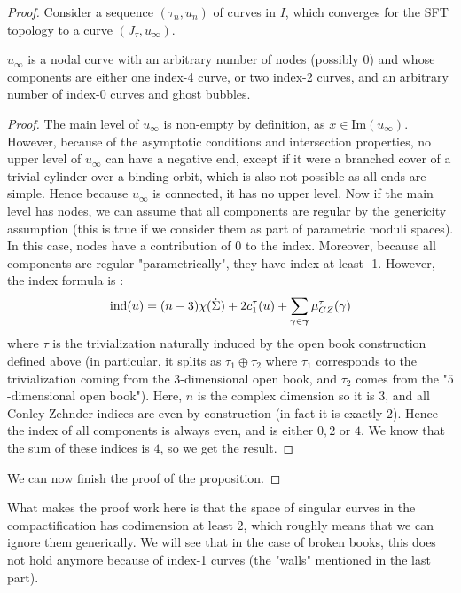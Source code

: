 \documentclass[../main.tex]{subfiles}
\begin{document}
\begin{proof}
Consider a sequence $(\tau_n,u_n) $ of curves in $I$, which converges for the SFT topology to a curve $(J_\tau,u_\infty)$. 

\begin{lemma}
$u_\infty$ is a nodal curve with an arbitrary number of nodes (possibly 0) and whose components are either one index-4 curve, or two index-2 curves, and an arbitrary number of index-0 curves and ghost bubbles. 
\end{lemma}

\begin{proof}
The main level of $u_\infty$ is non-empty by definition, as $x\in \text{Im}(u_\infty)$. However, because of the asymptotic conditions and intersection properties, no upper level of $u_\infty$ can have a negative end, except if it were a branched cover of a trivial cylinder over a binding orbit, which is also not possible as all ends are simple. Hence because $u_\infty$ is connected, it has no upper level. Now if the main level has nodes, we can assume that all components are regular by the genericity assumption (this is true if we consider them as part of parametric moduli spaces). In this case, nodes have a contribution of 0 to the index. Moreover, because all components are regular "parametrically", they have index at least -1. However, the index formula is :
$$\text{ind}(u) = (n-3)\chi(\dot\Sigma) + 2c_1^\tau(u) + \displaystyle\sum_{\gamma\in \bm\gamma}\mu_{CZ}^\tau(\gamma)$$
where $\tau$ is the trivialization naturally induced by the open book construction defined above (in particular, it splits as $\tau_1 \oplus \tau_2$ where $\tau_1$ corresponds to the trivialization coming from the $3$-dimensional open book, and $\tau_2$ comes from the "$5$-dimensional open book"). Here, $n$ is the complex dimension so it is $3$, and all Conley-Zehnder indices are even by construction (in fact it is exactly $2$). Hence the index of all components is always even, and is either $0,2$ or $4$. We know that the sum of these indices is $4$, so we get the result. 
\end{proof}

We can now finish the proof of the proposition. 

\end{proof}

\begin{remark}
What makes the proof work here is that the space of singular curves in the compactification has codimension at least $2$, which roughly means that we can ignore them generically. We will see that in the case of broken books, this does not hold anymore because of index-1 curves (the "walls" mentioned in the last part).
\end{remark}
\end{document}

